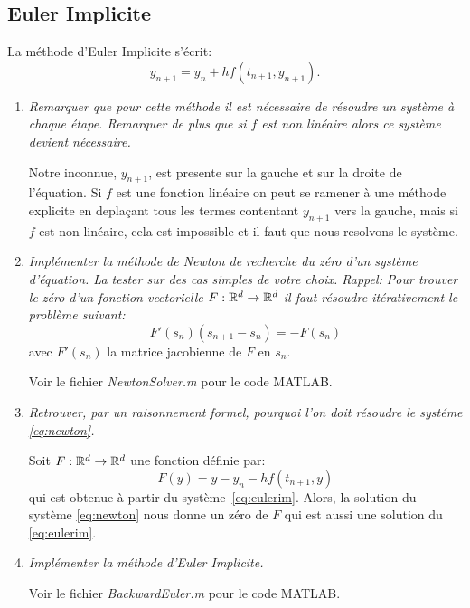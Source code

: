 \documentclass[a4paper,10pt]{article}
\begin{document}
\subsection{Euler Implicite}
La méthode d’Euler Implicite s’écrit:
\begin{equation}\label{eq:eulerim}
    y_{n + 1} = y_n + h f(t_{n + 1}, y_{n + 1}).
\end{equation}

\begin{enumerate}
    \item \emph{Remarquer que pour cette méthode il est nécessaire de résoudre un
    système à chaque étape. Remarquer de plus que si $f$ est non linéaire alors ce
    système devient nécessaire.}

    Notre inconnue, $y_{n + 1}$, est presente sur la gauche et sur la droite de
    l'équation. Si $f$ est une fonction linéaire on peut se ramener à une méthode
    explicite en deplaçant tous les termes contentant $y_{n + 1}$ vers la gauche,
    mais si $f$ est non-linéaire, cela est impossible et il faut que nous resolvons
    le système.

    \item \emph{Implémenter la méthode de Newton de recherche du zéro d’un système
    d’équation. La tester sur des cas simples de votre choix. Rappel: Pour trouver
    le zéro d'un fonction vectorielle $F: \mathbb{R}^d \to \mathbb{R}^d$ il faut
    résoudre itérativement le problème suivant:}
\begin{equation}\label{eq:newton}
    F'(s_n)(s_{n + 1} - s_n) = -F(s_n)
\end{equation}
avec $F'(s_n)$ la matrice jacobienne de $F$ en $s_n$.

    Voir le fichier \emph{NewtonSolver.m} pour le code MATLAB.

    \item \emph{Retrouver, par un raisonnement formel, pourquoi l'on doit résoudre le
    systéme \eqref{eq:newton}.}

    Soit $F: \mathbb{R}^d \to \mathbb{R}^d$ une fonction définie par:
\[
    F(y) = y - y_{n} - hf(t_{n + 1}, y)
\]
qui est obtenue à partir du système~\eqref{eq:eulerim}. Alors, la solution du système
\eqref{eq:newton} nous donne un zéro de $F$ qui est aussi une solution du
\eqref{eq:eulerim}.

    \item \emph{Implémenter la méthode d’Euler Implicite.}

    Voir le fichier \emph{BackwardEuler.m} pour le code MATLAB.


\end{enumerate}
\end{document}
